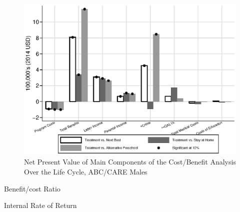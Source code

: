 \begin{frame}[plain]
	\begin{center}
\begin{figure}[H] 
\caption{Net Present Value of Main Components of the Cost/Benefit Analysis Over the Life Cycle, ABC/CARE Males}
\label{figure:youlabel}
\centering
\includegraphics[width=.9\columnwidth]{output/abccare_npvs2.eps}
\end{figure}
\end{center}
\end{frame}

\begin{frame}{Benefit/cost Ratio}
\begin{center}
\tiny
\scalebox{.75}{
}
\end{center}
\end{frame}

\begin{frame}{Internal Rate of Return}
\begin{center}
\tiny
\scalebox{.75}{
}
\end{center}
\end{frame}







